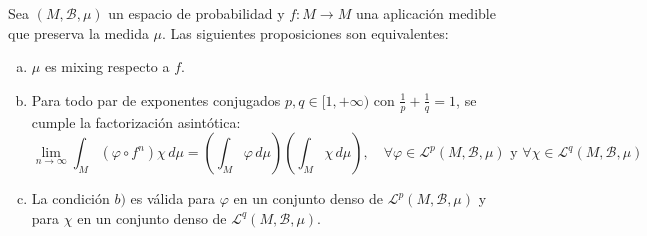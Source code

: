\begin{teorema}
	Sea $(M, \mathcal{B}, \mu)$ un espacio de probabilidad y $f: M \to M$ una aplicación medible que preserva la medida $\mu$. Las siguientes proposiciones son equivalentes:
	\begin{enumerate}[a)]
		\item $\mu$ es mixing respecto a $f$.
		\item Para todo par de exponentes conjugados $p, q \in [1, +\infty)$ con $\frac{1}{p} + \frac{1}{q} = 1$, se cumple la factorización asintótica:
		$$ \lim_{n \to \infty} \int_M (\varphi \circ f^n)\chi \, d\mu = \left( \int_M \varphi \, d\mu \right) \left( \int_M \chi \, d\mu \right), \quad \forall \varphi \in \mathcal{L}^p(M, \mathcal{B}, \mu) \text{ y } \forall \chi \in \mathcal{L}^q(M, \mathcal{B}, \mu) $$
		\item La condición $b)$ es válida para $\varphi$ en un conjunto denso de $\mathcal{L}^p(M, \mathcal{B}, \mu)$ y para $\chi$ en un conjunto denso de $\mathcal{L}^q(M, \mathcal{B}, \mu)$.
	\end{enumerate}
\end{teorema}

